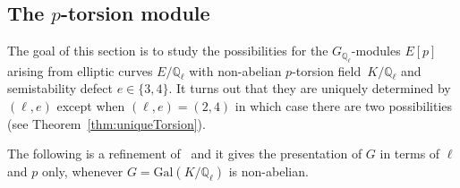 \documentclass[12pt]{amsart}
\numberwithin{equation}{section}
\theoremstyle{definition}
\newcommand{\Q}{\mathbb{Q}}
\newcommand{\Gal}{\text{Gal}}
\begin{document}
\subsection{The \texorpdfstring{$p$}{}-torsion module}
The goal of this section is to study the possibilities for the
$G_{\Q_\ell}$-modules $E[p]$ arising from elliptic curves $E/\Q_\ell$ with non-abelian $p$-torsion field~$K/\Q_\ell$ and semistability defect $e \in \{3,4\}$. It turns out that they are uniquely determined by~$(\ell,e)$
except when $(\ell,e) = (2,4)$ in which case there are two possibilities (see Theorem~\ref{thm:uniqueTorsion}). 

The following is a refinement of~\cite[Proposition~9]{symplectic} and it gives the presentation of $G$ in terms of $\ell$ and $p$ only, whenever $G=\Gal(K/\Q_\ell)$ is non-abelian.
\end{document}
